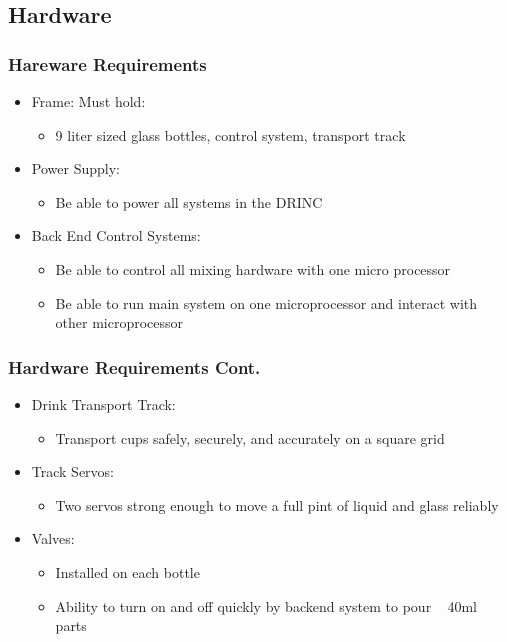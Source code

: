 \subsection{Hardware}

\begin{frame}
    \frametitle{Hareware Requirements}
    \begin{itemize}
        \item {\large Frame: Must hold:}
        \begin{itemize}
            \item 9 liter sized glass bottles, control system, transport track
        \end{itemize}
        \item {\large Power Supply:}
        \begin{itemize}
            \item Be able to power all systems in the DRINC
        \end{itemize}
        \item {\large Back End Control Systems:}
        \begin{itemize}
            \item Be able to control all mixing hardware with one micro 
            processor
            \item Be able to run main system on one microprocessor and interact 
            with other microprocessor
        \end{itemize}
    \end{itemize}
\end{frame}

\begin{frame}
    \frametitle{Hardware Requirements Cont.}
    \begin{itemize}
        \item {\large Drink Transport Track:}
        \begin{itemize}
            \item Transport cups safely, securely, and accurately on a square 
            grid
        \end{itemize}
        \item {\large Track Servos:}
        \begin{itemize}
            \item Two servos strong enough to move a full pint of liquid and 
            glass reliably
        \end{itemize}
        \item {\large Valves:}
        \begin{itemize}
            \item Installed on each bottle
            \item Ability to turn on and off quickly by backend system to pour ~
            40ml parts
        \end{itemize}
    \end{itemize}
\end{frame}

